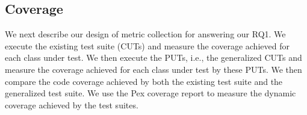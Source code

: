 \subsection{Coverage}

We next describe our design of metric collection for answering our RQ1. We execute the existing test suite (CUTs) and measure the coverage achieved for each class under test. We then execute the PUTs, i.e., the generalized CUTs and measure the coverage achieved for each class under test by these PUTs. We then compare the code coverage achieved by both the existing test suite and the generalized test suite. We use the Pex coverage report to measure the dynamic coverage achieved by the test suites. 

